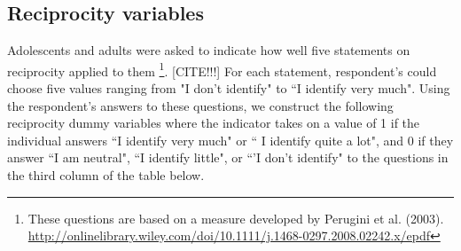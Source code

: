 \subsection{Reciprocity variables}
Adolescents and adults were asked to indicate how well five statements on reciprocity applied to them \footnote{ These questions are based on a measure developed by Perugini et al. (2003). \url{http://onlinelibrary.wiley.com/doi/10.1111/j.1468-0297.2008.02242.x/epdf}}. [CITE!!!] For each statement, respondent's could choose five values ranging from  "I don't identify" to ``I identify very much". Using the respondent's answers to these questions, we construct the following reciprocity dummy variables where the indicator takes on a value of 1 if the individual answers ``I identify very much" or `` I identify quite a lot", and 0 if they answer ``I am neutral", ``I identify little", or ``'I don't identify" to the questions in the third column of the table below.
\begin{table}[H]
\begin{center}
\end{center}
\end{table}
